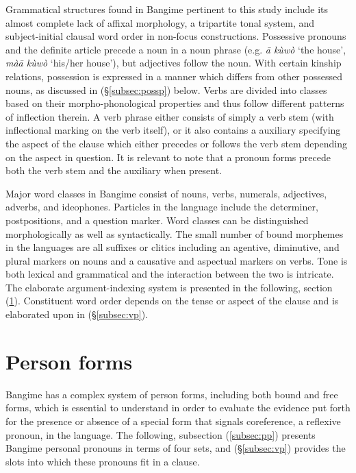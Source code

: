 \documentclass[output=paper]{langscibook}
\begin{document}
Grammatical structures found in Bangime pertinent to this study include its almost complete lack of affixal morphology, a tripartite tonal system, and subject-initial clausal word order in non-focus constructions. Possessive pronouns and the definite article precede a noun in a noun phrase (e.g. \textit{ā kùwò} `the house', \textit{màā kùwò} `his/her house'), but adjectives follow the noun. With certain kinship relations, possession is expressed in a manner which differs from other possessed nouns, as discussed in (\S \ref{subsec:possp}) below. Verbs are divided into classes based on their morpho-phonological properties and thus follow different patterns of inflection therein. A verb phrase either consists of simply a verb stem (with inflectional marking on the verb itself), or it also contains a auxiliary specifying the aspect of the clause which either precedes or follows the verb stem depending on the aspect in question. It is relevant to note that a pronoun forms precede both the verb stem and the auxiliary when present.

Major word classes in Bangime consist of nouns, verbs, numerals, adjectives, adverbs, and ideophones. Particles in the language include the determiner, postpositions, and a question marker. Word classes can be distinguished morphologically as well as syntactically. The small number of bound morphemes in the languages are all suffixes or clitics including an agentive, diminutive, and plural markers on nouns and a causative and aspectual markers on verbs. Tone is both lexical and grammatical and the interaction between the two is intricate. The elaborate argument-indexing system is presented in the following, section (\ref{sec:pf}). Constituent word order depends on the tense or aspect of the clause and is elaborated upon in (\S \ref{subsec:vp}). 

\section{Person forms}
\label{sec:pf}
Bangime has a complex system of person forms, including both bound and free forms, which is essential to understand in order to evaluate the evidence put forth for the presence or absence of a special form that signals coreference, a reflexive pronoun, in the language. The following, subsection (\ref{subsec:pp}) presents Bangime personal pronouns in terms of four sets, and (\S \ref{subsec:vp}) provides the slots into which these pronouns fit in a clause.
\end{document}
